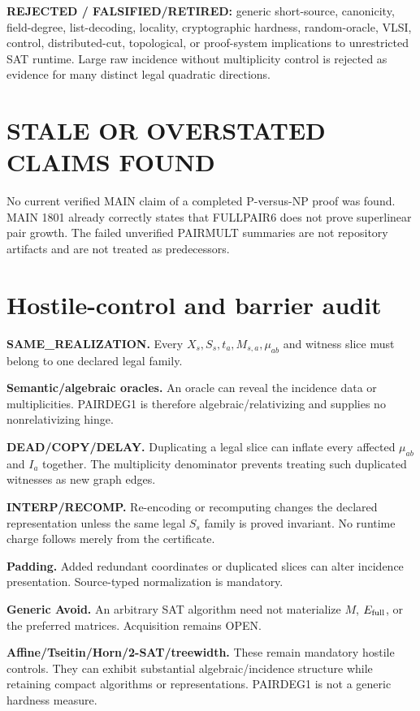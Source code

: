 \documentclass[11pt]{article}
\begin{document}
\textbf{REJECTED / FALSIFIED/RETIRED:} generic short-source, canonicity, field-degree, list-decoding, locality, cryptographic hardness, random-oracle, VLSI, control, distributed-cut, topological, or proof-system implications to unrestricted SAT runtime. Large raw incidence without multiplicity control is rejected as evidence for many distinct legal quadratic directions.

\section*{STALE OR OVERSTATED CLAIMS FOUND}
No current verified MAIN claim of a completed P-versus-NP proof was found. MAIN 1801 already correctly states that FULLPAIR6 does not prove superlinear pair growth. The failed unverified PAIRMULT summaries are not repository artifacts and are not treated as predecessors.

\section*{Hostile-control and barrier audit}
\textbf{SAME\_REALIZATION.} Every \(X_s,S_s,t_a,M_{s,a},\mu_{ab}\) and witness slice must belong to one declared legal family.

\textbf{Semantic/algebraic oracles.} An oracle can reveal the incidence data or multiplicities. PAIRDEG1 is therefore algebraic/relativizing and supplies no nonrelativizing hinge.

\textbf{DEAD/COPY/DELAY.} Duplicating a legal slice can inflate every affected \(\mu_{ab}\) and \(I_a\) together. The multiplicity denominator prevents treating such duplicated witnesses as new graph edges.

\textbf{INTERP/RECOMP.} Re-encoding or recomputing changes the declared representation unless the same legal \(S_s\) family is proved invariant. No runtime charge follows merely from the certificate.

\textbf{Padding.} Added redundant coordinates or duplicated slices can alter incidence presentation. Source-typed normalization is mandatory.

\textbf{Generic Avoid.} An arbitrary SAT algorithm need not materialize \(M\), \(E_{\rm full}\), or the preferred matrices. Acquisition remains OPEN.

\textbf{Affine/Tseitin/Horn/2-SAT/treewidth.} These remain mandatory hostile controls. They can exhibit substantial algebraic/incidence structure while retaining compact algorithms or representations. PAIRDEG1 is not a generic hardness measure.
\end{document}
